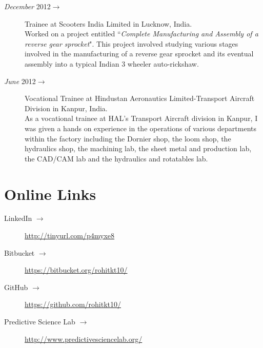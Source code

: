 \documentclass[margin,line,a4paper]{resume}
\begin{document}
\begin{resume}
\begin{description}
    \item[\textit{December} 2012$\rightarrow$ ] Trainee at Scooters India Limited in Lucknow, India. \\
    Worked on a project entitled ``\textit{Complete Manufacturing and Assembly of a reverse gear sprocket}". This project involved studying various stages involved in the manufacturing of a reverse gear sprocket and its eventual assembly into a typical Indian 3 wheeler auto-rickshaw.    
    
    \item[\textit{June} 2012$\rightarrow$ ] Vocational Trainee at Hindustan Aeronautics Limited-Transport Aircraft Division in Kanpur, India. \\
    As a vocational trainee at HAL's Transport Aircraft division in Kanpur, I was given a hands on experience in the operations of various departments within the factory including the Dornier shop, the loom shop, the hydraulics shop, the machining lab, the sheet metal and production lab, the CAD/CAM lab and the hydraulics and rotatables lab.
    \end{description}



\section{\mysidestyle Online Links}
\begin{description} 
\item[LinkedIn $\rightarrow$]  \url{http://tinyurl.com/p4myxe8}
\item[Bitbucket $\rightarrow$] \url{https://bitbucket.org/rohitkt10/}
\item[GitHub $\rightarrow$] \url{https://github.com/rohitkt10/}
\item[Predictive Science Lab $\rightarrow$] \url{http://www.predictivesciencelab.org/} 
\end{description} 
\end{resume}
\end{document}
